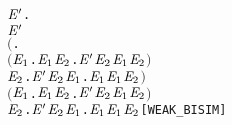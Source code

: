 \begin{alltt}
     \HOLTokenDefEquality{}
     \HOLSymConst{\HOLTokenForall{}} \ensuremath{\HOLBoundVar{E}\sp{\prime}}.
           \ensuremath{\HOLBoundVar{E}\sp{\prime}} \HOLSymConst{\HOLTokenImp{}}
         \ensuremath{(}\HOLSymConst{\HOLTokenForall{}}.
              \ensuremath{(}\HOLSymConst{\HOLTokenForall{}}\ensuremath{\HOLBoundVar{E}\sb{\mathrm{1}}}.  \HOLTokenTransBegin{} \HOLTokenTransEnd \ensuremath{\HOLBoundVar{E}\sb{\mathrm{1}}} \HOLSymConst{\HOLTokenImp{}} \HOLSymConst{\HOLTokenExists{}}\ensuremath{\HOLBoundVar{E}\sb{\mathrm{2}}}. \ensuremath{\HOLBoundVar{E}\sp{\prime}} \HOLTokenWeakTransBegin{} \HOLTokenWeakTransEnd \ensuremath{\HOLBoundVar{E}\sb{\mathrm{2}}} \HOLSymConst{\HOLTokenConj{}}  \ensuremath{\HOLBoundVar{E}\sb{\mathrm{1}}} \ensuremath{\HOLBoundVar{E}\sb{\mathrm{2}}}\ensuremath{)} \HOLSymConst{\HOLTokenConj{}}
              \HOLSymConst{\HOLTokenForall{}}\ensuremath{\HOLBoundVar{E}\sb{\mathrm{2}}}. \ensuremath{\HOLBoundVar{E}\sp{\prime}} \HOLTokenTransBegin{} \HOLTokenTransEnd \ensuremath{\HOLBoundVar{E}\sb{\mathrm{2}}} \HOLSymConst{\HOLTokenImp{}} \HOLSymConst{\HOLTokenExists{}}\ensuremath{\HOLBoundVar{E}\sb{\mathrm{1}}}.  \HOLTokenWeakTransBegin{} \HOLTokenWeakTransEnd \ensuremath{\HOLBoundVar{E}\sb{\mathrm{1}}} \HOLSymConst{\HOLTokenConj{}}  \ensuremath{\HOLBoundVar{E}\sb{\mathrm{1}}} \ensuremath{\HOLBoundVar{E}\sb{\mathrm{2}}}\ensuremath{)} \HOLSymConst{\HOLTokenConj{}}
         \ensuremath{(}\HOLSymConst{\HOLTokenForall{}}\ensuremath{\HOLBoundVar{E}\sb{\mathrm{1}}}.  \HOLTokenTransBegin\HOLSymConst{\ensuremath{\tau}}\HOLTokenTransEnd \ensuremath{\HOLBoundVar{E}\sb{\mathrm{1}}} \HOLSymConst{\HOLTokenImp{}} \HOLSymConst{\HOLTokenExists{}}\ensuremath{\HOLBoundVar{E}\sb{\mathrm{2}}}. \ensuremath{\HOLBoundVar{E}\sp{\prime}} \HOLSymConst{\HOLTokenEPS} \ensuremath{\HOLBoundVar{E}\sb{\mathrm{2}}} \HOLSymConst{\HOLTokenConj{}}  \ensuremath{\HOLBoundVar{E}\sb{\mathrm{1}}} \ensuremath{\HOLBoundVar{E}\sb{\mathrm{2}}}\ensuremath{)} \HOLSymConst{\HOLTokenConj{}}
         \HOLSymConst{\HOLTokenForall{}}\ensuremath{\HOLBoundVar{E}\sb{\mathrm{2}}}. \ensuremath{\HOLBoundVar{E}\sp{\prime}} \HOLTokenTransBegin\HOLSymConst{\ensuremath{\tau}}\HOLTokenTransEnd \ensuremath{\HOLBoundVar{E}\sb{\mathrm{2}}} \HOLSymConst{\HOLTokenImp{}} \HOLSymConst{\HOLTokenExists{}}\ensuremath{\HOLBoundVar{E}\sb{\mathrm{1}}}.  \HOLSymConst{\HOLTokenEPS} \ensuremath{\HOLBoundVar{E}\sb{\mathrm{1}}} \HOLSymConst{\HOLTokenConj{}}  \ensuremath{\HOLBoundVar{E}\sb{\mathrm{1}}} \ensuremath{\HOLBoundVar{E}\sb{\mathrm{2}}}\hfill{[WEAK_BISIM]}
\end{alltt}

